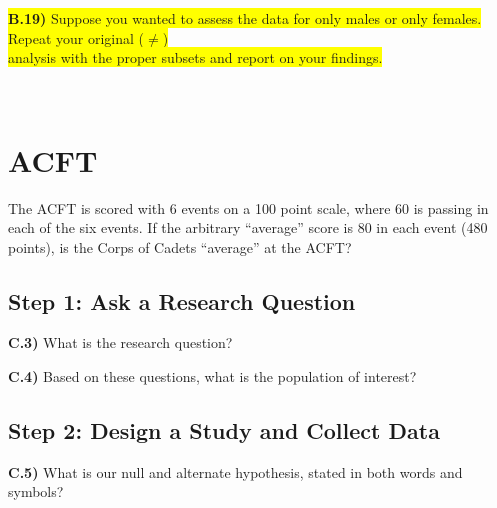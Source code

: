 \documentclass{article}
\newif\ifPrintSolution
\newcommand{\sol}[1]{\ifPrintSolution {\color{blue} #1 } \fi}
\begin{document}
\colorbox{yellow}{\textbf{B.19)} Suppose you wanted to assess the data for only males or only females. Repeat your original ($\ne$) } \\ \colorbox{yellow}{analysis with the proper subsets and report on your findings.}

\sol{MALES: $t = \frac{824 - 800}{\frac{85.1}{\sqrt{234}}}$ = 4.314094, p-value = 2.37e$^{-5}$}\\
\sol{FEMALES: $t = \frac{847 - 800}{\frac{77.1}{\sqrt{59}}}$ = 4.682411, p-value = 1.75e$^{-5}$}

\pagebreak

\section*{ACFT}

The ACFT is scored with 6 events on a 100 point scale, where 60 is passing in each of the six events. If the arbitrary ``average'' score is 80 in each event (480 points), is the Corps of Cadets ``average'' at the ACFT?

\subsection*{Step 1: Ask a Research Question}

\textbf{C.3)} What is the research question?

\sol{Is the Corps of Cadets average ACFT score equal to 480 or not?}

\vspace{0.25in}

\textbf{C.4)} Based on these questions, what is the population of interest?

\sol{The population of interest is the Corps of Cadets}

\vspace{0.25in}

\subsection*{Step 2: Design a Study and Collect Data}

\textbf{C.5)} What is our null and alternate hypothesis, stated in both words and symbols?

\sol{$H_0: \mu = 480$. The true mean ACFT score for the Corps of Cadets is 480.\\
$H_a: \mu \ne 480$. The true mean ACFT score for the Corps of Cadets is not 480.}

\vspace{0.35in}
\end{document}
